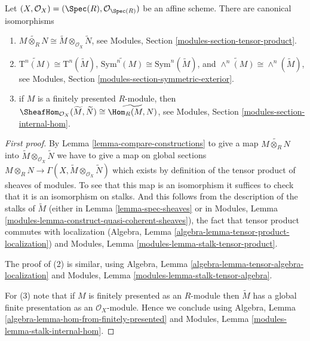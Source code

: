 \begin{lemma}
\label{lemma-widetilde-constructions}
Let $(X, \mathcal{O}_X) = (\Spec(R), \mathcal{O}_{\Spec(R)})$
be an affine scheme. There are canonical isomorphisms
\begin{enumerate}
\item
$
\widetilde{M \otimes_R N}
\cong
\widetilde M \otimes_{\mathcal{O}_X} \widetilde N
$,
see Modules, Section \ref{modules-section-tensor-product}.
\item
$
\widetilde{\text{T}^n(M)}
\cong
\text{T}^n(\widetilde M)
$,
$
\widetilde{\text{Sym}^n(M)}
\cong
\text{Sym}^n(\widetilde M)
$, and
$
\widetilde{\wedge^n(M)}
\cong
\wedge^n(\widetilde M)
$,
see
Modules, Section \ref{modules-section-symmetric-exterior}.
\item if $M$ is a finitely presented $R$-module, then
$
\SheafHom_{\mathcal{O}_X}(\widetilde M, \widetilde N)
\cong
\widetilde{\Hom_R(M,  N)}
$,
see
Modules, Section \ref{modules-section-internal-hom}.
\end{enumerate}
\end{lemma}

\begin{proof}[First proof]
By Lemma \ref{lemma-compare-constructions} to give a map
$\widetilde{M \otimes_R N}$ into
$\widetilde M \otimes_{\mathcal{O}_X} \widetilde N$
we have to give a map on global sections
$M \otimes_R N \to
\Gamma(X, \widetilde M \otimes_{\mathcal{O}_X} \widetilde N)$
which exists by definition of the tensor product of sheaves
of modules. To see that this map is an isomorphism it
suffices to check that it is an isomorphism on stalks.
And this follows from the description of the stalks
of $\widetilde{M}$ (either in Lemma \ref{lemma-spec-sheaves} or in
Modules, Lemma \ref{modules-lemma-construct-quasi-coherent-sheaves}),
the fact that tensor product commutes with localization
(Algebra, Lemma \ref{algebra-lemma-tensor-product-localization}) and
Modules, Lemma \ref{modules-lemma-stalk-tensor-product}.

\medskip\noindent
The proof of (2) is similar, using
Algebra, Lemma \ref{algebra-lemma-tensor-algebra-localization} and
Modules, Lemma \ref{modules-lemma-stalk-tensor-algebra}.

\medskip\noindent
For (3) note that if $M$ is finitely presented as an $R$-module
then $\widetilde M$ has a global finite presentation as an
$\mathcal{O}_X$-module. Hence we conclude using
Algebra, Lemma \ref{algebra-lemma-hom-from-finitely-presented} and
Modules, Lemma \ref{modules-lemma-stalk-internal-hom}.
\end{proof}

